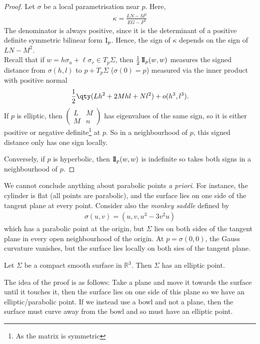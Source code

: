 \begin{proof}
	Let $\sigma$ be a local parametrisation near $p$.
	Here,
	\begin{align*}
		\kappa = \frac{LN-M^2}{EG-F^2}
	\end{align*}
	The denominator is always positive, since it is the determinant of a positive definite symmetric bilinear form $\operatorname{\mathrm{I}}_p$.
	Hence, the sign of $\kappa$ depends on the sign of $LN-M^2$. \\
	Recall that if $w = h \sigma_u + \ell \sigma_v \in T_p \Sigma$, then $\frac{1}{2} \operatorname{\mathrm{I\!I}}_p(w,w)$ measures the signed distance from $\sigma(h,l)$ to $p + T_p \Sigma$ ($\sigma(0) = p$) measured via the inner product with positive normal
	\begin{align*}
		\frac{1}{2} \qty(L h^2 + 2 Mhl + Nl^2) + o(h^3, l^3).
	\end{align*} 
	If $p$ is elliptic, then $\begin{pmatrix}L & M \\M & n\end{pmatrix}$ has eigenvalues of the same sign, so it is either positive or negative definite\footnote{As the matrix is symmetric} at $p$.
	So in a neighbourhood of $p$, this signed distance only has one sign locally.

	Conversely, if $p$ is hyperbolic, then $\operatorname{\mathrm{I\!I}}_p(w,w)$ is indefinite so takes both signs in a neighbourhood of $p$.
\end{proof}

\begin{remark}
	We cannot conclude anything about parabolic points \textit{a priori}.
	For instance, the cylinder is flat (all points are parabolic), and the surface lies on one side of the tangent plane at every point.
	Consider also the \textit{monkey saddle} defined by
	\begin{align*}
		\sigma(u,v) = (u,v,u^3 - 3v^2 u)
	\end{align*}
	which has a parabolic point at the origin, but $\Sigma$ lies on both sides of the tangent plane in every open neighbourhood of the origin.
	At $p = \sigma(0,0)$, the Gauss curvature vanishes, but the surface lies locally on both sies of the tangent plane.
\end{remark}

\begin{proposition}
	Let $\Sigma$ be a compact smooth surface in $\mathbb R^3$.
	Then $\Sigma$ has an elliptic point.
\end{proposition}

The idea of the proof is as follows: Take a plane and move it towards the surface until it touches it, then the surface lies on one side of this plane so we have an elliptic/parabolic point.
If we instead use a bowl and not a plane, then the surface must curve away from the bowl and so must have an elliptic point.

